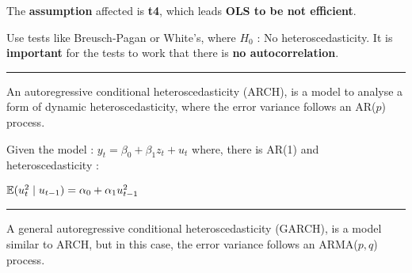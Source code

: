   \begin{f}

The \textbf{assumption} affected is \textbf{t4}, which leads \textbf{OLS to be not efficient}.

Use tests like Breusch-Pagan or White's, where \(H_{0}\) : No heteroscedasticity. It is \textbf{important} for the tests to work that there is \textbf{no autocorrelation}.

\end{f}  \hrule  
\begin{f}[ARCH]

An autoregressive conditional heteroscedasticity (ARCH), is a model to analyse a form of dynamic heteroscedasticity, where the error variance follows an AR(\(p\)) process.

Given the model : \(y_{t} = \beta_{0} + \beta_{1} z_{t} + u_{t}\) where, there is AR(1) and heteroscedasticity :

\begin{center}
	\(\mathbb{E}(u^{2}_{t} \mid u_{t - 1}) = \alpha_{0} + \alpha_{1} u^{2}_{t - 1}\)
\end{center}

\end{f}  \hrule 
 \begin{f}[GARCH]

A general autoregressive conditional heteroscedasticity (GARCH), is a model similar to ARCH, but in this case, the error variance follows an ARMA(\(p, q\)) process.
\end{f}